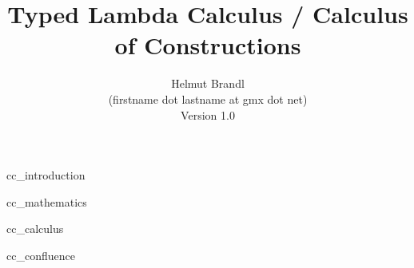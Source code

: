 \documentclass[12pt]{article}
\begin{document}


\title{
    Typed Lambda Calculus / Calculus of Constructions
}

\author{
    Helmut Brandl
    \\
    \scriptsize (firstname dot lastname at gmx dot net)
    \\
    \scriptsize Version 1.0
}
\date{}

\maketitle





\tableofcontents

 {cc_introduction}

 {cc_mathematics}

 {cc_calculus}

 {cc_confluence}






\end{document}
